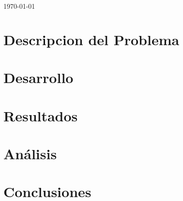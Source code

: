 \documentclass[letterpaper,11pt]{article}
\begin{document}
\begin{titlepage}


{\large \today}\\[2cm] 


\vfill 

\end{titlepage}

\newpage
\tableofcontents

\newpage

\section{Descripcion del Problema}


\section{Desarrollo}


\section{Resultados}

\section{Análisis}

\section{Conclusiones}




\end{document}
